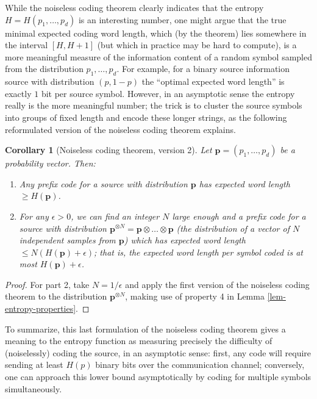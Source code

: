 \documentclass[11pt]{report}
\theoremstyle{plain}
\newtheorem{cor}[thm]{Corollary}
\theoremstyle{definition}
\begin{document}
While the noiseless coding theorem clearly indicates that the entropy $H=H(p_1,\ldots,p_d)$ is an interesting number, one might argue that the true minimal expected coding word length, which (by the theorem) lies somewhere in the interval $[H,H+1]$ (but which in practice may be hard to compute), is a more meaningful measure of the information content of a random symbol sampled from the distribution $p_1,\ldots,p_d$. For example, for a binary source information source with distribution $(p,1-p)$ the ``optimal expected word length'' is exactly $1$ bit per source symbol. However, in an asymptotic sense the entropy really is the more meaningful number; the trick is to cluster the source symbols into groups of fixed length and encode these longer strings, as the following reformulated version of the noiseless coding theorem explains.

\begin{cor}[Noiseless coding theorem, version 2]
Let $\mathbf{p}=(p_1,\ldots,p_d)$ be a probability vector. Then:

\begin{enumerate}[label=\arabic*.]
\item Any prefix code for a source with distribution $\mathbf{p}$ has expected word length $\ge H(\mathbf{p})$.
\item For any $\epsilon>0$, we can find an integer $N$ large enough and a prefix code for a source with distribution $\mathbf{p}^{\otimes N}=\mathbf{p}\otimes\ldots\otimes\mathbf{p}$ (the distribution of a vector of $N$ independent samples from $\mathbf{p}$) which has expected word length $\le N(H(\mathbf{p})+\epsilon)$; that is, the expected word length \emph{per symbol coded} is at most $H(\mathbf{p})+\epsilon$.
\end{enumerate}

\end{cor}

\begin{proof}
For part 2, take $N=1/\epsilon$ and apply the first version of the noiseless coding theorem to the distribution $\mathbf{p}^{\otimes N}$, making use of property 4 in Lemma \ref{lem-entropy-properties}.
\end{proof}

To summarize, this last formulation of the noiseless coding theorem gives a meaning to the entropy function as measuring precisely the difficulty of (noiselessly) coding the source, in an asymptotic sense: first, any code will require sending at least $H(p)$ binary bits over the communication channel; conversely, one can approach this lower bound asymptotically by coding for multiple symbols simultaneously.
\end{document}
